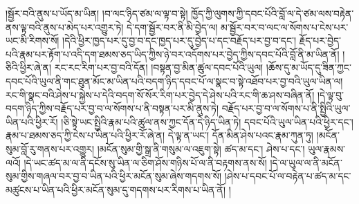 །སྦྱོར་བའི་ནུས་པ་ཡོད་མ་ཡིན། །བ་ལང་ཉིད་ཙམ་ལ་ལྟ་བ་སྟེ། ཁྱོད་ཀྱི་ལུགས་ཀྱི་དབང་པོའི་བློ་ལ་དེ་ཙམ་ལས་བརྟེན་ནས་ལྟ་བའི་ནུས་པ་མེད་པར་འགྱུར་ཏེ། དེ་དག་སྦྱོར་བར་ནི་མི་བྱེད་ལ། མ་སྦྱོར་བར་བ་ལང་ལ་སོགས་པ་ངེས་པར་ཡང་མི་རིགས་སོ། །དེའི་ཕྱིར་ཁྱད་པར་དུ་བྱ་བ་དང་ཁྱད་པར་དུ་བྱེད་པ་དང་བརྗོད་པར་བྱ་བ་དང་། རྗོད་པར་བྱེད་པའི་རྣམ་པར་རྟོག་པ་འདི་དག་ཐམས་ཅད་ཡིད་ཀྱིས་ཉེ་བར་འདོགས་པར་བྱེད་ཀྱིས་དབང་པོའི་བློ་ནི་མ་ཡིན་ནོ། །ཅིའི་ཕྱིར་ཞེ་ན། རང་རང་རིག་པར་བྱ་བའི་དོན། །བསྟན་བྱ་མིན་ཚུལ་དབང་པོའི་ཡུལ། །ཆོས་དུ་མ་ཡོད་དུ་ཟིན་ཀྱང་དབང་པོའི་ཡུལ་ནི་གང་ཐུན་མོང་མ་ཡིན་པའི་བདག་ཉིད་དབང་པོ་ལ་སྣང་བ་སྟེ་འཐོབ་པར་བྱ་བའི་ཡུལ་ཡིན་ལ། རང་གི་སྣང་བའི་ཤེས་པ་སྐྱེས་པ་དེའི་བདག་སོ་སོར་རིག་པར་བྱེད་དེ་ཤེས་པའི་རང་གི་ཆ་ཤས་བཞིན་ནོ། །དེ་ལྟ་བུ་བདག་ཉིད་ཀྱིས་བརྗོད་པར་བྱ་བ་ལ་སོགས་པ་ནི་བསྟན་པར་མི་ནུས་ཏེ། བརྗོད་པར་བྱ་བ་ལ་སོགས་པ་ནི་སྤྱིའི་ཡུལ་ཡིན་པའི་ཕྱིར་རོ། །ཅི་སྟེ་ཡང་སྤྱིའི་རྣམ་པའི་ཚུལ་ནས་ཀྱང་དོན་དེ་ཉིད་ཡིན་ཏེ། དབང་པོའི་ཡུལ་ཡིན་པའི་ཕྱིར་དང་། རྣམ་པ་ཐམས་ཅད་ཀྱི་ངེས་པ་ཡིན་པའི་ཕྱིར་རོ་ཞེ་ན། དེ་ལྟ་ན་ཡང་། དོན་མིན་ཤེས་པའང་རྣམ་ཀུན་ཏུ། །མངོན་སུམ་བློ་རུ་གནས་པར་འགྱུར། །མངོན་སུམ་གྱི་སྒྲ་ནི་གསུམ་ལ་འཇུག་སྟེ། ཚད་མ་དང་། ཤེས་པ་དང་། ཡུལ་རྣམས་ལའོ། །དེ་ཡང་ཚད་མ་ལ་ནི་དངོས་སུ་ཡིན་ལ་ཅིག་ཤོས་གཉིས་པོ་ལ་ནི་བརྟགས་ནས་སོ། །དེ་ལ་ཡུལ་ལ་ནི་མངོན་སུམ་གྱིས་གཞལ་བར་བྱ་བ་ཡིན་པའི་ཕྱིར་མངོན་སུམ་ཞེས་གདགས་སོ། །ཤེས་པ་དབང་པོ་ལ་བརྟེན་པ་ཚད་མ་དང་མཚུངས་པ་ཡིན་པའི་ཕྱིར་མངོན་སུམ་དུ་གདགས་པར་རིགས་པ་ཡིན་ནོ། །
